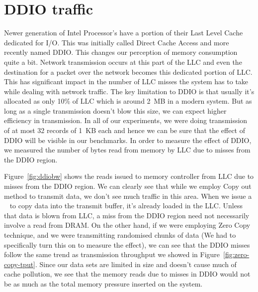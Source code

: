 
\section{DDIO traffic}

Newer generation of Intel Processor's have a portion of their Last Level Cache dedicated for I/O. This was initially called Direct Cache Access\textregistered 
and more recently named DDIO\textregistered. This changes our perception of memory consumption quite a bit. Network transmission occurs at this part of the LLC 
and even the destination for a packet over the network becomes this dedicated portion of LLC. This has significant impact in the number of LLC misses the system 
has to take while dealing with network traffic. The key limitation to DDIO is that usually it's allocated as only 10\% of LLC which is around 2~MB in a modern system. 
But as long as a single transmission doesn't blow this size, we can expect higher efficiency in transmission. In all of our experiments, we were doing transmission of 
at most 32 records of 1~KB each and hence we can be sure that the effect of DDIO will be visible in our benchmarks. In order to measure the 
effect of DDIO, we measured the number of bytes read from memory by LLC due to misses from the DDIO region. 

Figure~\ref{fig:ddiobw} shows the reads issued to memory controller from LLC due to misses from the  DDIO region. We can clearly see that while we employ Copy out 
method to transmit data, we don't see much traffic in this area. When we issue a \memcpy~ to copy data into the transmit buffer, it's already loaded in the LLC. 
Unless that data is blown from LLC, a miss from the DDIO region need not necessarily involve a read from DRAM. On the other hand, if we were employing Zero Copy technique, 
and we were transmitting randomised chunks of data (We had to specifically turn this on to measure the effect), we can see that the DDIO misses follow the same trend 
as transmission throughput we showed in Figure~\ref{fig:zero-copy-tput}. Since our data sets are limited in size and doesn't cause much of cache pollution, we see that the 
memory reads due to misses in DDIO would not be as much as the total memory pressure inserted on the system. 

